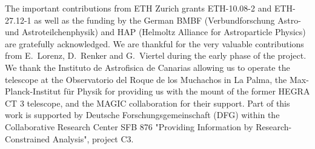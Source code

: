 The important contributions from ETH Zurich grants ETH-10.08-2 and ETH-27.12-1 as well as the funding by the German BMBF (Verbundforschung Astro- und Astroteilchenphysik) and HAP (Helmoltz Alliance for Astroparticle Physics) are gratefully acknowledged.
We are thankful for the very valuable contributions from E.~Lorenz,  D.~Renker and G.~Viertel during the early phase of the project.
We thank the Instituto de Astrofisica de Canarias allowing us to operate the telescope at the Observatorio del Roque de los Muchachos in La Palma, the Max-Planck-Institut f\"ur Physik for providing us with the mount of the former HEGRA CT 3 telescope, and the MAGIC collaboration for their support.
Part of this work is supported by Deutsche Forschungsgemeinschaft (DFG) within the Collaborative Research Center SFB 876 "Providing Information by Research-Constrained Analysis", project C3. 
